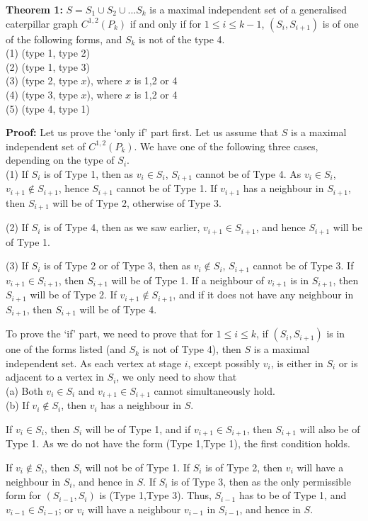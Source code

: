 \documentclass[10pt]{article}
\begin{document}
{\textbf{Theorem 1:}} $S= S_1 \cup S_2 \cup ...  S_k$ is a maximal
independent set of a generalised caterpillar graph $C^{1,2}(P_k)$ if and
only if for $1\leq i \leq k-1$, $(S_i,S_{i+1})$ is of one of the
following forms, and $S_k$ is not of the type 4.\\ (1) (type 1, type 2)\\
(2) (type 1, type 3)\\ (3) (type 2, type $x$), where $x$ is 1,2 or 4\\
(4) (type 3, type $x$), where $x$ is 1,2 or 4\\ (5) (type 4, type 1)

{\textbf{Proof:}} Let us prove the `only if' part first. Let us assume
that $S$ is a maximal independent set of $C^{1,2}(P_k)$. We have one of
the following three cases, depending on the type of $S_i$.\\
(1)  If $S_i$ is of Type 1, then as $v_i\in S_i$, $S_{i+1}$ cannot be
of Type 4. As $v_i\in S_i$, $v_{i+1} \notin S_{i+1}$, hence $S_{i+1}$
cannot be of Type 1. If $v_{i+1}$ has a neighbour in $S_{i+1}$, then
$S_{i+1}$ will be of Type 2, otherwise of Type 3.

\noindent (2) If $S_i$ is of Type 4, then as we saw earlier, $v_{i+1}\in S_{i+1}$,
and hence $S_{i+1}$ will be of Type 1.

\noindent (3) If $S_i$ is of Type 2 or of Type 3, then as $v_i \notin S_i$,
$S_{i+1}$ cannot be of Type 3. If $v_{i+1}\in S_{i+1}$, then $S_{i+1}$
will be of Type 1. If a neighbour of $v_{i+1}$ is in $S_{i+1}$, then
$S_{i+1}$ will be of Type 2. If $v_{i+1}\not\in S_{i+1}$, and if it does
not have any neighbour in $S_{i+1}$, then $S_{i+1}$ will be of Type 4.

To prove the `if' part, we need to prove that for $1\leq i \leq k$, if
$(S_i,S_{i+1})$ is in one of the forms listed (and $S_k$ is not of Type
4), then $S$ is a maximal independent set. As each vertex at stage $i$,
except possibly $v_i$, is either in $S_i$ or is adjacent to a vertex in
$S_i$, we only need to show that \\ (a) Both $v_i\in S_i$ and $v_{i+1}\in
S_{i+1}$ cannot simultaneously hold.\\ (b) If $v_i\not\in S_i$, then
$v_i$ has a neighbour in $S$.

If $v_i\in S_i$, then $S_i$ will be of Type 1, and if $v_{i+1}\in
S_{i+1}$, then $S_{i+1}$ will also be of Type 1. As we do not have the
form (Type 1,Type 1), the first condition holds.

If $v_i\not\in S_i$, then $S_i$ will not be of Type 1. If $S_i$ is of
Type 2, then $v_i$ will have a neighbour in $S_i$, and hence in $S$. If
$S_i$ is of Type 3, then as the only permissible form for $(S_{i-1},S_i)$
is (Type 1,Type 3). Thus, $S_{i-1}$ has to be of Type 1, and $v_{i-1}\in
S_{i-1}$; or $v_i$ will have a neighbour $v_{i-1}$ in $S_{i-1}$, and
hence in $S$.
\end{document}
